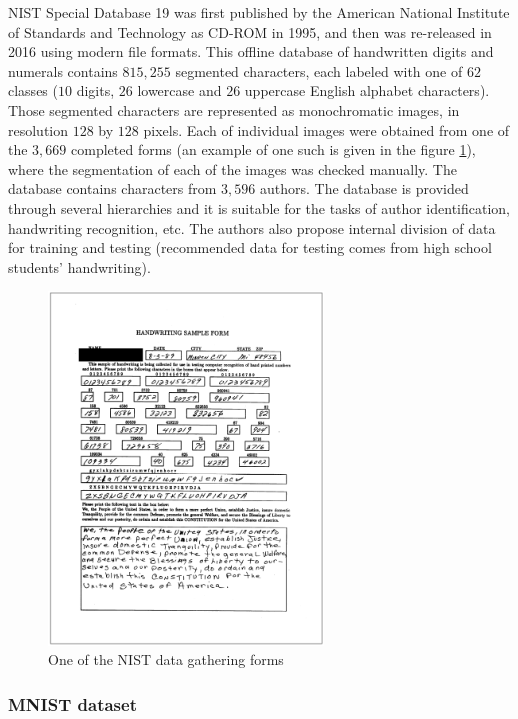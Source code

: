 \documentclass[eng]{simposium}
\begin{document}
NIST Special Database 19 \cite{12,13} was first published by the American National Institute of Standards and Technology as CD-ROM in 1995, and then was  
re-released in 2016 using modern file formats.  
This offline database of handwritten digits and numerals contains $815,255$ segmented characters, each labeled  
with one of $62$ classes ($10$ digits, $26$ lowercase and $26$ uppercase English alphabet characters).  
Those segmented characters are represented as monochromatic images, in resolution $128$ by $128$ pixels.  
Each of individual images were obtained from one of the $3,669$ completed forms (an example of one such is given in the figure \ref{fig:nist}),  
where the segmentation of each of the images was checked manually.  
The database contains characters from $3,596$ authors.  
The database is provided through several hierarchies and it is suitable for the tasks of author identification, handwriting recognition, etc.  
The authors also propose internal division of data for training and testing  
(recommended data for testing comes from high school students' handwriting).  

\begin{figure}[!ht] 
  \centering 
  \includegraphics[width=0.65\textwidth]{nist.png} 
  \caption{One of the NIST data gathering forms \cite{9}} 
  \label{fig:nist} 
\end{figure} 

\subsubsection{MNIST dataset} 
\end{document}
